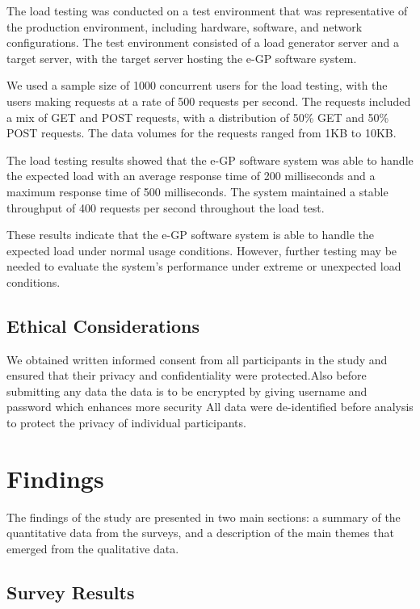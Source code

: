 \documentclass{report}
\begin{document}
The load testing was conducted on a test environment that was representative of the production environment, including hardware, software, and network configurations. The test environment consisted of a load generator server and a target server, with the target server hosting the e-GP software system.

We used a sample size of 1000 concurrent users for the load testing, with the users making requests at a rate of 500 requests per second. The requests included a mix of GET and POST requests, with a distribution of 50\% GET and 50\% POST requests. The data volumes for the requests ranged from 1KB to 10KB.

The load testing results showed that the e-GP software system was able to handle the expected load with an average response time of 200 milliseconds and a maximum response time of 500 milliseconds. The system maintained a stable throughput of 400 requests per second throughout the load test.

These results indicate that the e-GP software system is able to handle the expected load under normal usage conditions. However, further testing may be needed to evaluate the system's performance under extreme or unexpected load conditions.

\subsection{Ethical Considerations}

We obtained written informed consent from all participants in the study and ensured that their privacy and confidentiality were protected.Also before submitting any data the data is to be encrypted by giving username and password which enhances more security All data were de-identified before analysis to protect the privacy of individual participants. 

\section{Findings}

The findings of the study are presented in two main sections: a summary of the quantitative data from the surveys, and a description of the main themes that emerged from the qualitative data.

\subsection{Survey Results}
\end{document}
